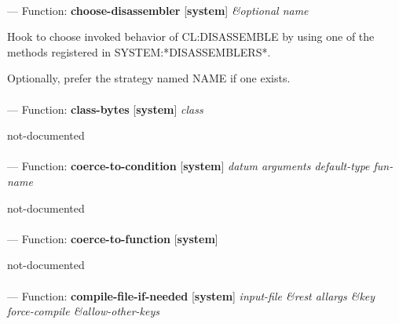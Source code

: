 \paragraph{}
\label{SYSTEM:CHOOSE-DISASSEMBLER}
--- Function: \textbf{choose-disassembler} [\textbf{system}] \textit{\&optional name}

\begin{adjustwidth}{5em}{5em}
Hook to choose invoked behavior of CL:DISASSEMBLE by using one of the methods registered in SYSTEM:*DISASSEMBLERS*. 

Optionally, prefer the strategy named NAME if one exists.
\end{adjustwidth}

\paragraph{}
\label{SYSTEM:CLASS-BYTES}
--- Function: \textbf{class-bytes} [\textbf{system}] \textit{class}

\begin{adjustwidth}{5em}{5em}
not-documented
\end{adjustwidth}

\paragraph{}
\label{SYSTEM:COERCE-TO-CONDITION}
--- Function: \textbf{coerce-to-condition} [\textbf{system}] \textit{datum arguments default-type fun-name}

\begin{adjustwidth}{5em}{5em}
not-documented
\end{adjustwidth}

\paragraph{}
\label{SYSTEM:COERCE-TO-FUNCTION}
--- Function: \textbf{coerce-to-function} [\textbf{system}] \textit{}

\begin{adjustwidth}{5em}{5em}
not-documented
\end{adjustwidth}

\paragraph{}
\label{SYSTEM:COMPILE-FILE-IF-NEEDED}
--- Function: \textbf{compile-file-if-needed} [\textbf{system}] \textit{input-file \&rest allargs \&key force-compile \&allow-other-keys}

